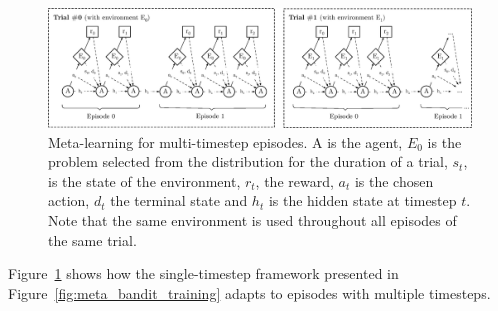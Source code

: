 \begin{figure}
	\centering
	\includegraphics[width=\linewidth]{fig/meta_cartpole.eps}
	\caption{Meta-learning for multi-timestep episodes. A is the agent,
	$E_0$ is the problem selected from the distribution for the duration
	of a trial, $s_t$, is the state of the environment, $r_t$, the reward,
	$a_t$ is the chosen action, $d_t$ the terminal state and $h_t$ is
	the hidden state at timestep $t$. Note that the same environment is
	used throughout all episodes of the same trial.}
	\label{fig:meta_cartpole}
\end{figure}

Figure~\ref{fig:meta_cartpole} shows how the single-timestep framework
presented in Figure~\ref{fig:meta_bandit_training} adapts to episodes
with multiple timesteps.





